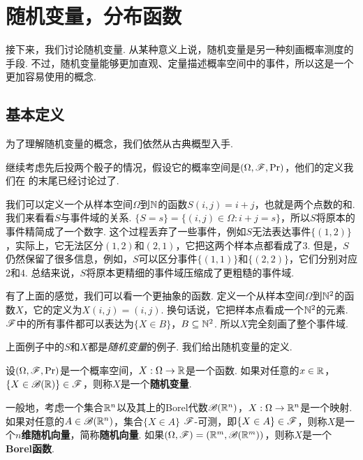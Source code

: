\section{随机变量，分布函数}\label{sec:random-variable}

接下来，我们讨论随机变量. 从某种意义上说，随机变量是另一种刻画概率测度的手段. 不过，随机变量能够更加直观、定量描述概率空间中的事件，所以这是一个更加容易使用的概念. 

\subsection{基本定义}

为了理解随机变量的概念，我们依然从古典概型入手. 

\begin{example}\label{ex:random-variable}
继续考虑先后投两个骰子的情况，假设它的概率空间是$(\Omega,\mathscr{F},\Pr)$，他们的定义我们在 的末尾已经讨论过了. 

我们可以定义一个从样本空间$\Omega$到$\mathbb{N}$的函数$S(i,j)=i+j$，也就是两个点数的和. 我们来看看$S$与事件域的关系. $\{S=s\}=\{(i,j)\in\Omega:i+j=s\}$，所以$S$将原本的事件精简成了一个数字. 这个过程丢弃了一些事件，例如$S$无法表达事件$\{(1,2)\}$，实际上，它无法区分$(1,2)$和$(2,1)$，它把这两个样本点都看成了$3$. 但是，$S$仍然保留了很多信息，例如，$S$可以区分事件$\{(1,1)\}$和$\{(2,2)\}$，它们分别对应$2$和$4$. 总结来说，$S$将原本更精细的事件域压缩成了更粗糙的事件域. 

有了上面的感觉，我们可以看一个更抽象的函数. 定义一个从样本空间$\Omega$到$\mathbb{N}^2$的函数$X$，它的定义为$X(i,j) = (i,j)$. 换句话说，它把样本点看成一个$\mathbb{N}^2$的元素. $\mathscr{F}$中的所有事件都可以表达为$\{X\in B\}$，$B\subseteq\mathbb{N}^2$. 所以$X$完全刻画了整个事件域. 
\end{example}

上面例子中的$S$和$X$都是\emph{随机变量}的例子. 我们给出随机变量的定义. 

\begin{definition}
设$(\Omega,\mathscr{F},\Pr)$是一个概率空间，$X:\Omega\to\mathbb{R}$是一个函数. 如果对任意的$x\in\mathbb{R}$，$\{X\in\mathscr{B}(\mathbb{R})\}\in\mathscr{F}$，则称$X$是一个\textbf{随机变量}. 

一般地，考虑一个集合$\mathbb{R}^n$以及其上的Borel代数$\mathscr{B}(\mathbb{R}^n)$，$X:\Omega\to \mathbb{R}^n$是一个映射. 如果对任意的$A\in\mathscr{B}(\mathbb{R}^n)$，集合$\{X\in A\}$ $\mathscr{F}$-可测，即$\{X\in A\}\in\mathscr{F}$，则称$X$是一个\textbf{$n$维随机向量}，简称\textbf{随机向量}. 如果$(\Omega,\mathscr{F})=(\mathbb{R}^m,\mathscr{B}(\mathbb{R}^m))$，则称$X$是一个\textbf{Borel函数}.
\end{definition}

